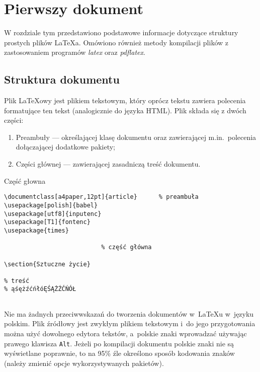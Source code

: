 \chapter{Pierwszy dokument}\label{cha:pierwszyDokument}

W rozdziale tym przedstawiono podstawowe informacje dotyczące struktury prostych plików \LaTeX a. Omówiono również metody kompilacji plików z zastosowaniem programów \emph{latex} oraz \emph{pdflatex}. %


\section{Struktura dokumentu}\label{sec:strukturaDokumentu}

Plik \LaTeX owy jest plikiem tekstowym, który oprócz tekstu zawiera polecenia formatujące ten tekst (analogicznie do języka HTML). Plik składa się z dwóch części: %
\begin{enumerate}%
\item Preambuły --- określającej klasę dokumentu oraz zawierającej m.in.\ polecenia dołączającej dodatkowe pakiety;

\item Części głównej --- zawierającej zasadniczą treść dokumentu.
\end{enumerate}

\begin{program}
  \caption{Część głowna}
\begin{lstlisting}
\documentclass[a4paper,12pt]{article}      % preambuła
\usepackage[polish]{babel}
\usepackage[utf8]{inputenc}
\usepackage[T1]{fontenc}
\usepackage{times}

                           % część główna

\section{Sztuczne życie}

% treść
% ąśężźćńłóĘŚĄŻŹĆŃÓŁ


\end{lstlisting}
\end{program}

Nie ma żadnych przeciwwskazań do tworzenia dokumentów w~\LaTeX u w~języku polskim. Plik źródłowy jest zwykłym plikiem tekstowym i~do jego przygotowania można użyć dowolnego edytora tekstów, a~polskie znaki wprowadzać używając prawego klawisza \texttt{Alt}. Jeżeli po kompilacji dokumentu polskie znaki nie są wyświetlane poprawnie, to na 95\% źle określono sposób kodowania znaków (należy zmienić opcje wykorzystywanych pakietów).  %


